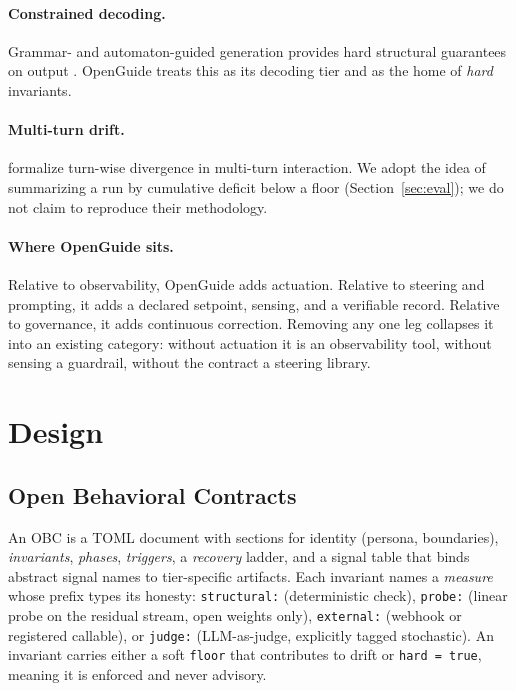 \documentclass[11pt]{article}
\newcommand{\sys}{OpenGuide}
\newcommand{\obc}{OBC}
\newcommand{\code}[1]{\texttt{#1}}
\begin{document}
\paragraph{Constrained decoding.}
Grammar- and automaton-guided generation provides hard structural guarantees on
output \citep{willard2023outlines}. \sys{} treats this as its decoding tier and as
the home of \emph{hard} invariants.

\paragraph{Multi-turn drift.}
\citet{dongre2025drift} formalize turn-wise divergence in multi-turn interaction.
We adopt the idea of summarizing a run by cumulative deficit below a floor
(Section~\ref{sec:eval}); we do not claim to reproduce their methodology.

\paragraph{Where \sys{} sits.}
Relative to observability, \sys{} adds actuation. Relative to steering and
prompting, it adds a declared setpoint, sensing, and a verifiable record.
Relative to governance, it adds continuous correction. Removing any one leg
collapses it into an existing category: without actuation it is an observability
tool, without sensing a guardrail, without the contract a steering library.

\section{Design}
\label{sec:design}

\subsection{Open Behavioral Contracts}
\label{sec:obc}

An \obc{} is a TOML document with sections for identity (persona, boundaries),
\emph{invariants}, \emph{phases}, \emph{triggers}, a \emph{recovery} ladder, and a
signal table that binds abstract signal names to tier-specific artifacts. Each
invariant names a \emph{measure} whose prefix types its honesty:
\code{structural:} (deterministic check), \code{probe:} (linear probe on the
residual stream, open weights only), \code{external:} (webhook or registered
callable), or \code{judge:} (LLM-as-judge, explicitly tagged stochastic). An
invariant carries either a soft \code{floor} that contributes to drift or
\code{hard = true}, meaning it is enforced and never advisory.
\end{document}
